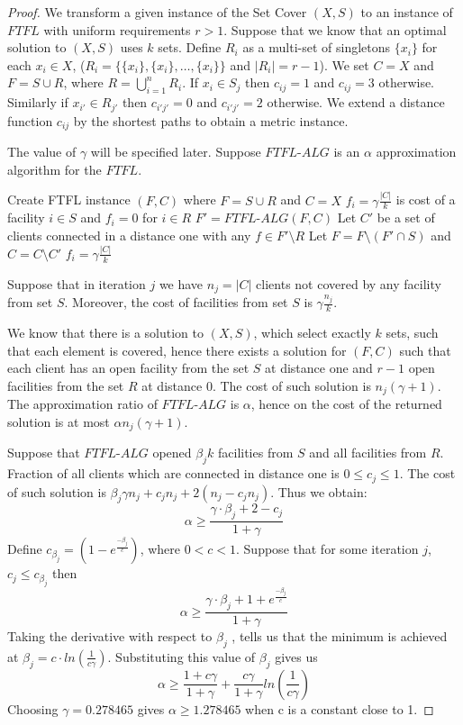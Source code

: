 \documentclass{llncs}
\begin{document}
\begin{proof}
 We transform a given instance of the Set Cover $(X, S)$ to an instance of $FTFL$ with uniform requirements $r > 1$. Suppose that we know that an optimal solution to $(X, S)$ uses $k$ sets. Define $R_i$ as a multi-set of singletons $\{x_i\}$ for each $x_i \in X$, ($R_i = \{\{x_i\}, \{x_i\}, \dots, \{x_i\}\}$ and $|R_i| = r - 1$). We set $C = X$ and $F = S \cup R$, where $R = \bigcup_{i = 1}^{n} R_i$. If $x_i \in S_j$ then $c_{ij} = 1$ and $c_{ij} = 3$ otherwise. Similarly if $x_{i'} \in R_{j'}$ then $c_{i'j'} = 0$ and $c_{i'j'} = 2$ otherwise. We extend a distance function $c_{ij}$ by the shortest paths to obtain a metric instance. 
 
 The value of $\gamma$ will be specified later. Suppose $FTFL$-$ALG$ is an $\alpha$ approximation algorithm for the $FTFL$.
\begin{algorithm}
  \caption{$Algorithm~(X, S)$}
\begin{algorithmic}[1]
 \STATE Create FTFL instance $(F, C)$ where $F = S \cup R$ and $C = X$
 \STATE $f_i = \gamma \frac{|C|}{k}$ is cost of a facility $i \in S$ and $f_i = 0$ for $i \in R$
  \STATE $F' = FTFL$-$ALG(F, C)$
  \STATE Let $C'$ be a set of clients connected in a distance one with any $f \in F' \setminus R$
  \STATE Let $F = F \setminus (F' \cap S)$ and $C = C \setminus C'$
    \STATE $f_i = \gamma \frac{|C|}{k}$
  \ENDFOR
 \ENDWHILE
\end{algorithmic} 
\end{algorithm}
 Suppose that in iteration $j$ we have $n_j = |C|$ clients not covered by any facility from set $S$. Moreover, the cost of facilities from set $S$ is $\gamma \frac{n_j}{k}$. 
 
 We know that there is a solution to $(X, S)$, which select exactly $k$ sets, such that each element is covered, hence there exists a solution for $(F, C)$ such that each client has an open facility from the set $S$ at distance one and $r-1$ open facilities from the set $R$ at distance 0. The cost of such solution is $n_j(\gamma + 1)$. The approximation ratio of $FTFL$-$ALG$ is $\alpha$, hence on the cost of the returned solution is at most $\alpha n_j(\gamma + 1)$. 
 
 Suppose that $FTFL$-$ALG$ opened $\beta_jk$ facilities from $S$ and all facilities from $R$. Fraction of all clients which are connected in distance one is $0 \leq c_j \leq 1$. The cost of such solution is $\beta_j \gamma n_j + c_jn_j + 2 (n_j - c_jn_j)$. Thus we obtain: $$\alpha \geq \frac{\gamma \cdot \beta_j + 2 - c_j}{1 + \gamma}$$ Define $c_{\beta_j} = (1 - e^{\frac{-\beta_j}{c}})$, where $0 < c < 1$. Suppose that for some iteration $j$, $c_j \leq c_{\beta_j}$ then $$\alpha \geq \frac{\gamma \cdot \beta_j + 1 + e^{\frac{-\beta_j}{c}}}{1 + \gamma}$$ Taking the derivative with respect to $\beta_j$ , tells us that the minimum is achieved at $\beta_j = c \cdot ln(\frac{1}{c\gamma})$. Substituting this value of $\beta_j$ gives us $$\alpha \geq \frac{1 + c\gamma}{1 + \gamma} + \frac{c\gamma}{1 + \gamma}ln(\frac{1}{c\gamma})$$ Choosing $\gamma = 0.278465$ gives $\alpha \geq 1.278465$ when c is a constant close to 1.
 

\end{proof}
\end{document}
